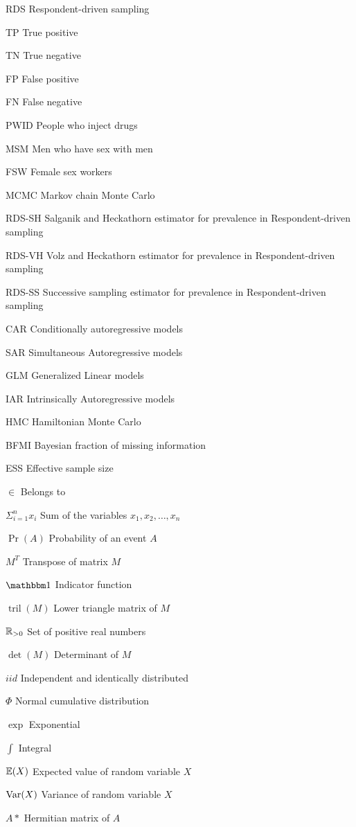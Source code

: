 \begin{siglas}
    \item[RDS] Respondent-driven sampling
    \item[TP] True positive 
    \item[TN] True negative
    \item[FP] False positive
    \item[FN] False negative
    \item[PWID] People who inject drugs
    \item[MSM] Men who have sex with men
    \item[FSW] Female sex workers      
    \item[MCMC] Markov chain Monte Carlo 
    \item[RDS-SH] Salganik and Heckathorn estimator for prevalence in
    Respondent-driven sampling 
    \item[RDS-VH] Volz and Heckathorn estimator for prevalence in
    Respondent-driven sampling
    \item[RDS-SS] Successive sampling estimator for prevalence in
    Respondent-driven sampling 
    \item[CAR] Conditionally autoregressive models
    \item[SAR] Simultaneous Autoregressive models
    \item[GLM] Generalized Linear models  
    \item[IAR] Intrinsically Autoregressive models
    \item[HMC] Hamiltonian Monte Carlo
    \item[BFMI] Bayesian fraction of missing information  
    \item[ESS] Effective sample size 
  \end{siglas}
  
  \begin{simbolos}
    \item[$\in$] Belongs to 
    \item[$\Sigma_{i=1}^n x_i$] Sum of the variables $x_1, x_2, \dots, x_n$
    \item[$\Pr(A)$] Probability of an event $A$
    \item[$M^T$] Transpose of matrix $M$
    \item[$\ind$] Indicator function 
    \item[$\operatorname{tril}(M)$] Lower triangle matrix of $M$
    \item[$\mathbb{R}_{>0}$] Set of positive real numbers
    \item[$\det(M)$] Determinant of $M$ 
    \item[$iid$] Independent and identically distributed
    \item[$\Phi$] Normal cumulative distribution
    \item[$\exp$] Exponential  
    \item[$\int$] Integral 
    \item[$\mathbb{E}(X)$] Expected value of random variable $X$ 
    \item[$\operatorname{Var}(X)$] Variance of random variable $X$
    \item[$A*$] Hermitian matrix of $A$ 
  \end{simbolos}